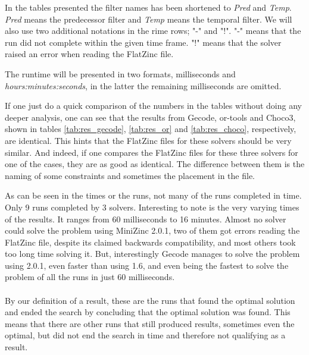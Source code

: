 In the tables presented the filter names has been shortened to \emph{Pred} and \emph{Temp}. \emph{Pred} means the predecessor filter and \emph{Temp} means the temporal filter. We will also use two additional notations in the rime rows; "-" and "!". "-" means that the run did not complete within the given time frame. "!" means that the solver raised an error when reading the FlatZinc file.

The runtime will be presented in two formats, milliseconds and \emph{hours:minutes:seconds}, in the latter the remaining milliseconds are omitted.














If one just do a quick comparison of the numbers in the tables without doing any deeper analysis, one can see that the results from Gecode, or-tools and Choco3, shown in tables \ref{tab:res_gecode}, \ref{tab:res_or} and \ref{tab:res_choco}, respectively, are identical. This hints that the FlatZinc files for these solvers should be very similar. And indeed, if one compares the FlatZinc files for these three solvers for one of the cases, they are as good as identical. The difference between them is the naming of some constraints and sometimes the placement in the file.

As can be seen in the times or the runs, not many of the runs completed in time. Only 9 runs completed by 3 solvers. Interesting to note is the very varying times of the results. It ranges from 60 milliseconds to 16 minutes. Almost no solver could solve the problem using MiniZinc 2.0.1, two of them got errors reading the FlatZinc file, despite its claimed backwards compatibility, and most others took too long time solving it. But, interestingly Gecode manages to solve the problem using 2.0.1, even faster than using 1.6, and even being the fastest to solve the problem of all the runs in just 60 milliseconds.
\\\\
By our definition of a result, these are the runs that found the optimal solution and ended the search by concluding that the optimal solution was found. This means that there are other runs that still produced results, sometimes even the optimal, but did not end the search in time and therefore not qualifying as a result.

